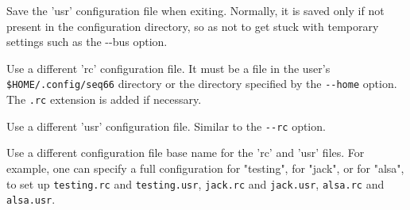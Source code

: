       Save the 'usr' configuration file when exiting.
      Normally, it is saved only if not present in the configuration directory,
      so as not to get stuck with temporary settings such as the -{}-bus option.


      Use a different 'rc' configuration file.
      It must be a file in the user's \texttt{\$HOME/.config/seq66}
      directory or the directory specified by the \texttt{-{}-home} option.
      The \texttt{.rc} extension is added if necessary.

      Use a different 'usr' configuration file.  Similar to the \texttt{-{}-rc}
      option.

      Use a different configuration file base name for the 'rc' and 'usr'
      files.  For example, one can specify a full configuration for "testing",
      for "jack", or for "alsa", to set up
      \texttt{testing.rc} and \texttt{testing.usr},
      \texttt{jack.rc} and \texttt{jack.usr},
      \texttt{alsa.rc} and \texttt{alsa.usr}.

